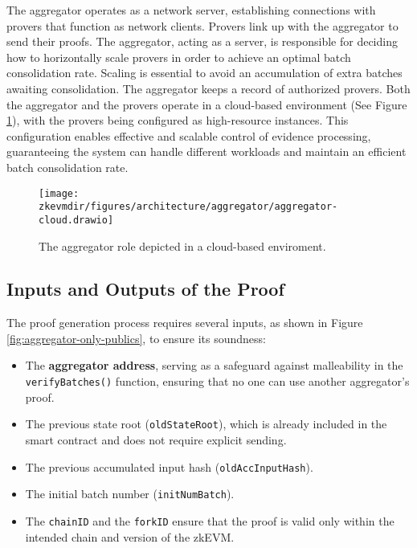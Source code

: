 The aggregator operates as a network server, establishing connections with provers that function as network clients. Provers link up with the aggregator to send their proofs. The aggregator, acting as a server, is responsible for deciding how to horizontally scale provers in order to achieve an optimal batch consolidation rate. Scaling is essential to avoid an accumulation of extra batches awaiting consolidation. The aggregator keeps a record of authorized provers. Both the aggregator and the provers operate in a cloud-based environment (See Figure \ref{fig:aggregator-cloud}), with the provers being configured as high-resource instances. This configuration enables effective and scalable control of evidence processing, guaranteeing the system can handle different workloads and maintain an efficient batch consolidation rate.


\begin{figure}[h]
\centering
\texttt{[image: \\zkevmdir/figures/architecture/aggregator/aggregator-cloud.drawio]}
\caption{The aggregator role depicted in a cloud-based enviroment.}
\label{fig:aggregator-cloud}
\end{figure}



\subsection{Inputs and Outputs of the Proof}

The proof generation process requires several inputs, as shown in Figure \ref{fig:aggregator-only-publics}, to ensure its soundness:

\begin{itemize}

\item The \textbf{aggregator address}, serving as a safeguard against malleability in the \texttt{verifyBatches()} function, ensuring that no one can use another aggregator's proof.

\item The previous state root (\texttt{oldStateRoot}), which is already included in the smart contract and does not require explicit sending.

\item The previous accumulated input hash (\texttt{oldAccInputHash}).

\item The initial batch number (\texttt{initNumBatch}).

\item The \texttt{chainID} and the \texttt{forkID} ensure that the proof is valid only within the intended chain and version of the zkEVM.


\end{itemize}


